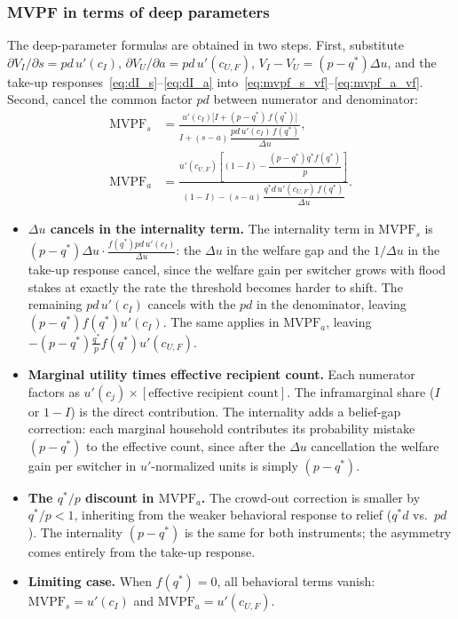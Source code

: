 \documentclass[12pt]{article}
\begin{document}
\subsubsection*{MVPF in terms of deep parameters}

The deep-parameter formulas are obtained in two steps. First, substitute $\partial V_I/\partial s=pd\,u'(c_I)$, $\partial V_U/\partial a=pd\,u'(c_{U,F})$, $V_I-V_U=(p-q^*)\Delta u$, and the take-up responses~\eqref{eq:dI_s}--\eqref{eq:dI_a} into~\eqref{eq:mvpf_s_vf}--\eqref{eq:mvpf_a_vf}. Second, cancel the common factor $pd$ between numerator and denominator:
\begin{align}
    \text{MVPF}_s &= \frac{u'(c_I)\bigl[I + (p-q^*)\,f(q^*)\bigr]}{I + (s-a)\,\dfrac{pd\,u'(c_I)\,f(q^*)}{\Delta u}}, \label{eq:mvpf_s} \\[14pt]
    \text{MVPF}_a &= \frac{u'(c_{U,F})\!\left[(1-I) - \dfrac{(p-q^*)q^*f(q^*)}{p}\right]}{(1-I) - (s-a)\,\dfrac{q^*d\,u'(c_{U,F})\,f(q^*)}{\Delta u}}. \label{eq:mvpf_a}
\end{align}

\begin{itemize}
    \item \textbf{$\Delta u$ cancels in the internality term.} The internality term in $\mathrm{MVPF}_s$ is $(p-q^*)\Delta u\cdot\frac{f(q^*)pd\,u'(c_I)}{\Delta u}$: the $\Delta u$ in the welfare gap and the $1/\Delta u$ in the take-up response cancel, since the welfare gain per switcher grows with flood stakes at exactly the rate the threshold becomes harder to shift. The remaining $pd\,u'(c_I)$ cancels with the $pd$ in the denominator, leaving $(p-q^*)f(q^*)u'(c_I)$. The same applies in $\mathrm{MVPF}_a$, leaving $-(p-q^*)\frac{q^*}{p}f(q^*)u'(c_{U,F})$.

    \item \textbf{Marginal utility times effective recipient count.} Each numerator factors as $u'(c_j)\times[\text{effective recipient count}]$. The inframarginal share ($I$ or $1-I$) is the direct contribution. The internality adds a belief-gap correction: each marginal household contributes its probability mistake $(p-q^*)$ to the effective count, since after the $\Delta u$ cancellation the welfare gain per switcher in $u'$-normalized units is simply $(p-q^*)$.

    \item \textbf{The $q^*/p$ discount in $\mathrm{MVPF}_a$.} The crowd-out correction is smaller by $q^*/p<1$, inheriting from the weaker behavioral response to relief ($q^*d$ vs.\ $pd$). The internality $(p-q^*)$ is the same for both instruments; the asymmetry comes entirely from the take-up response.


    \item \textbf{Limiting case.} When $f(q^*)=0$, all behavioral terms vanish: $\mathrm{MVPF}_s=u'(c_I)$ and $\mathrm{MVPF}_a=u'(c_{U,F})$. 
\end{itemize}
\end{document}
